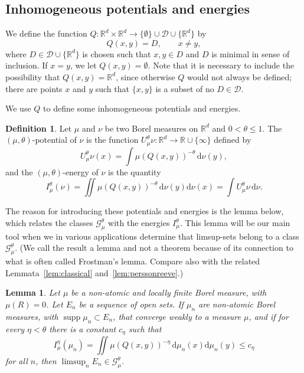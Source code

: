 \documentclass[11pt]{article}
\newtheorem{lemm}[theo]{Lemma}
\theoremstyle{definition}
\newtheorem{defi}[theo]{Definition}
\numberwithin{equation}{section}
\numberwithin{figure}{section}
\numberwithin{table}{section}
\DeclareMathOperator{\supp}{supp}
\newcommand*{\dd}{\mathrm{d}}
\begin{document}
\subsection{Inhomogeneous potentials and energies} \label{sec:inhomogeneous}

We define the function $Q \colon \mathbb{R}^d \times \mathbb{R}^d \to \{\emptyset \} \cup \mathscr{D} \cup \{\mathbb{R}^d\}$ by
\[
Q (x,y) = D, \qquad x \neq y,
\]
where $D \in \mathscr{D} \cup \{ \mathbb{R}^d \}$ is chosen such that $x,y \in D$ and $D$ is minimal in sense of inclusion. If $x = y$, we let $Q (x,y) = \emptyset$. Note that it is necessary to include the possibility that $Q (x,y) = \mathbb{R}^d$, since otherwise $Q$ would not always be defined; there are points $x$ and $y$ such that $\{x, y\}$ is a subset of no $D \in \mathscr{D}$.

We use $Q$ to define some inhomogeneous potentials and energies.

\begin{defi}
Let $\mu$ and $\nu$ be two Borel measures on $\mathbb{R}^d$ and $0 < \theta \leq 1$. The $(\mu, \theta)$-potential of $\nu$ is the function $U_\mu^\theta \nu \colon \mathbb{R}^d \to \mathbb{R} \cup \{\infty\}$ defined by
\[
U_\mu^\theta \nu (x) = \int \mu (Q(x,y))^{-\theta} \, \dd \nu (y),
\]
and the $(\mu,\theta)$-energy of $\nu$ is the quantity
\[
I_\mu^\theta (\nu) = \iint \mu (Q(x,y))^{-\theta} \, \dd \nu (y) \dd \nu (x) = \int U_\mu^\theta \nu \, \dd \nu.
\]
\end{defi}

The reason for introducing these potentials and energies is the lemma below, which relates the classes $\mathscr{G}_\mu^\theta$ with the energies $I_\mu^\theta$. This lemma will be our main tool when we in various applications determine that limsup-sets belong to a class $\mathscr{G}_\mu^\theta$. (We call the result a lemma and not a theorem because of its connection to what is often called Frostman's lemma. Compare also with the related Lemmata~\ref{lem:classical} and~\ref{lem:perssonreeve}.)

\begin{lemm}\label{lem:frostman}
Let $\mu$ be a non-atomic and locally finite Borel measure, with $\mu (R) = 0$. Let $E_n$ be a sequence of open sets. If $\mu_n$ are non-atomic Borel measures, with $\supp \mu_n \subset E_n$, that converge weakly to a measure $\mu$, and if for every $\eta < \theta$ there is a constant $c_\eta$ such that
\[
I_\mu^\eta (\mu_n) = \iint \mu (Q(x,y))^{-\eta} \, \dd \mu_n (x) \dd \mu_n (y) \leq c_\eta
\]
for all $n$, then $\limsup_n E_n \in \mathscr{G}_\mu^\theta$.
\end{lemm}
\end{document}
